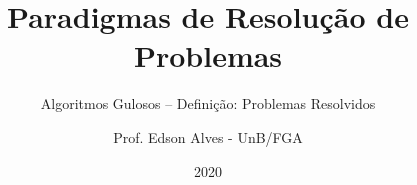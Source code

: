 \title{Paradigmas de Resolução de Problemas}
\subtitle{Algoritmos Gulosos -- Definição: Problemas Resolvidos}
\author{Prof. Edson Alves - UnB/FGA}
\date{2020}

